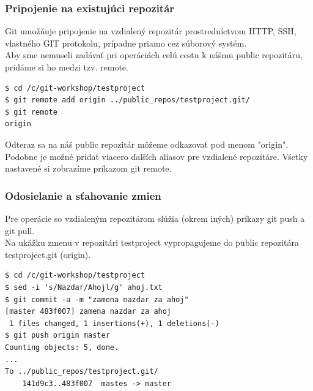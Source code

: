 \documentclass[red]{beamer}
\begin{document}
\begin{frame}[fragile]
\frametitle{Pripojenie na existujúci repozitár}   
Git umožňuje pripojenie na vzdialený repozitár prostredníctvom HTTP, SSH, vlastného GIT protokolu, prípadne priamo cez súborový systém. \\
Aby sme nemuseli zadávať pri operáciách celú cestu k nášmu public repozitáru, pridáme si ho medzi tzv. remote.

\begin{block}{}
\begin{verbatim}
$ cd /c/git-workshop/testproject
$ git remote add origin ../public_repos/testproject.git/
$ git remote
origin
\end{verbatim}
\end{block}

Odteraz sa na náš public repozitár môžeme odkazovať pod menom "origin". Podobne je možné pridať viacero ďalších aliasov pre vzdialené repozitáre. Vśetky nastavené si zobrazíme príkazom git remote.

\end{frame}

\begin{frame}[fragile]
\frametitle{Odosielanie a sťahovanie zmien}   
Pre operácie so vzdialeným repozitárom slúžia (okrem iných) príkazy git push a git pull.\\
Na ukážku zmenu v repozitári testproject vypropagujeme do public repozitára testproject.git (origin).

\begin{block}{}
\begin{verbatim}
$ cd /c/git-workshop/testproject
$ sed -i 's/Nazdar/Ahojl/g' ahoj.txt 
$ git commit -a -m "zamena nazdar za ahoj"
[master 483f007] zamena nazdar za ahoj
 1 files changed, 1 insertions(+), 1 deletions(-)
$ git push origin master
Counting objects: 5, done.
...
To ../public_repos/testproject.git/
    141d9c3..483f007  mastes -> master
\end{verbatim}
\end{block}
\end{frame}
\end{document}
